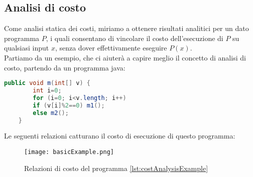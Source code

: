 \documentclass[../../main.tex]{subfiles}
\begin{document}
\subsection{Analisi di costo}
Come analisi statica dei costi, miriamo a ottenere risultati analitici per un dato programma $P$, i quali consentano di vincolare il costo dell'esecuzione di $P$ su qualsiasi input $x$, senza dover effettivamente eseguire $P(x)$.\autocite{albert2011closed}\\
Partiamo da un esempio, che ci aiuterà a capire meglio il concetto di analisi di costo, partendo da un programma java:\
\begin{lstlisting}[language=Java, caption={Esempio di Analisi di Costo}, label={lst:costAnalysisExample}]
    public void m(int[] v) {
        int i=0;
        for (i=0; i<v.length; i++)
        if (v[i]%2==0) m1();
        else m2();
    }
\end{lstlisting}
Le seguenti relazioni catturano il costo di esecuzione di questo programma:
\begin{figure}[H]
    \centering
    \texttt{[image: basicExample.png]}
    \caption{Relazioni di costo del programma \ref{lst:costAnalysisExample}}
\end{figure}
\end{document}
